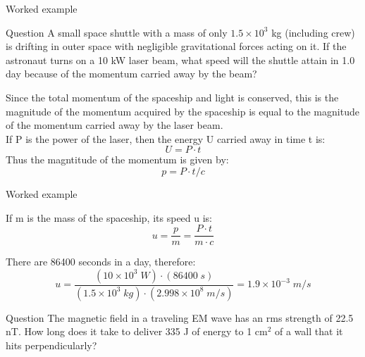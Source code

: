 
%
%

{
\problemslide

%
%
%
%

\begin{frame}{Worked example}

\begin{blockexmplque}{Question}
  A small space shuttle with a mass of only $1.5 \times 10^3$ kg
  (including crew) is drifting in outer space with negligible
  gravitational forces acting on it. If the astronaut turns
  on a 10 kW laser beam, what speed will the shuttle attain in 1.0 day
  because of the momentum carried away by the beam?
\end{blockexmplque}

Since the total momentum of the spaceship and light is conserved,
this is the magnitude of the momentum acquired by the spaceship
is equal to the magnitude of the momentum carried away by the laser beam.\\
\vspace{0.2cm}
If P is the power of the laser, then the energy U carried away in time t is:
\begin{equation*}
   U = P \cdot t
\end{equation*}
Thus the magntitude of the momentum is given by:
\begin{equation*}
   p = P \cdot t/c
\end{equation*}

\end{frame}

%
%
%
%

\begin{frame}{Worked example}

If m is the mass of the spaceship, its speed u is:
\begin{equation*}
  u = \frac{p}{m} = \frac{P \cdot t}{m \cdot c}
\end{equation*}

There are 86400 seconds in a day, therefore:
\begin{equation*}
  u = \frac{(10 \times 10^3 \; W)
      \cdot (86400 \; s)}{(1.5 \times 10^3 \; kg)
      \cdot (2.998\times 10^8 \; m/s)}
    = 1.9 \times 10^{-3} \; m/s
\end{equation*}

%
%
%

\begin{blockexmplque}{Question}
  The magnetic field in a traveling EM wave has an rms
  strength of 22.5 nT. How long does it take to deliver 335 J of
  energy to 1 cm$^2$ of a wall that it hits perpendicularly?
\end{blockexmplque}


\end{frame}}
